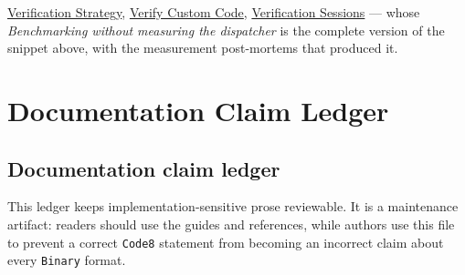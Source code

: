 \label{292862844209942199-dup24}{}


\href{internals\_\allowbreak{}verification.md}{Verification Strategy}, \href{internals\_\allowbreak{}verify\_\allowbreak{}custom.md}{Verify Custom Code}, \href{examples\_\allowbreak{}verification.md}{Verification Sessions} — whose \emph{Benchmarking without measuring the dispatcher} is the complete version of the snippet above, with the measurement post-mortems that produced it.



\chapter{Documentation Claim Ledger}


\section{Documentation claim ledger}



\label{2714160147126604465}{}


This ledger keeps implementation-sensitive prose reviewable. It is a maintenance artifact: readers should use the guides and references, while authors use this file to prevent a correct \texttt{Code8} statement from becoming an incorrect claim about every \texttt{Binary} format.




